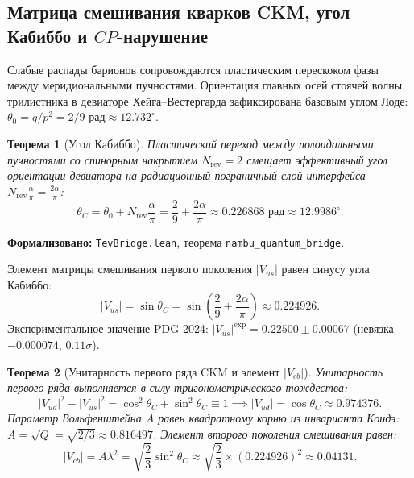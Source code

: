 \documentclass[11pt,a4paper]{article}
\newtheorem{theorem}{Теорема}
\theoremstyle{definition}
\theoremstyle{remark}
\begin{document}
\subsection{Матрица смешивания кварков CKM, угол Кабиббо и $CP$-нарушение}
	
Слабые распады барионов сопровождаются пластическим перескоком фазы между меридиональными пучностями. Ориентация главных осей стоячей волны трилистника в девиаторе Хейга--Вестергарда зафиксирована базовым углом Лоде: $\theta_0 = q / p^2 = 2/9\text{ рад} \approx 12.732^\circ$.
	
\begin{theorem}[Угол Кабиббо]
\label{thm:cabibbo_angle_exact}
Пластический переход между полоидальными пучностями со спинорным накрытием $N_{\mathrm{rev}} = 2$ смещает эффективный угол ориентации девиатора на радиационный пограничный слой интерфейса $N_{\mathrm{rev}}\frac{\alpha}{\pi} = \frac{2\alpha}{\pi}$:
\begin{equation}
	\theta_C = \theta_0 + N_{\mathrm{rev}}\frac{\alpha}{\pi} = \frac{2}{9} + \frac{2\alpha}{\pi} \approx 0.226868\text{ рад} \approx 12.9986^\circ.
	\label{eq:cabibbo_angle_exact}
\end{equation}
\end{theorem}

\noindent\small\textbf{Формализовано:} \texttt{TevBridge.lean}, теорема \texttt{nambu_quantum_bridge}.
	
Элемент матрицы смешивания первого поколения $|V_{us}|$ равен синусу угла Кабиббо:
\begin{equation}
	|V_{us}| = \sin\theta_C = \sin\left(\frac{2}{9} + \frac{2\alpha}{\pi}\right) \approx 0.224926.
	\label{eq:V_us_exact}
\end{equation}
Экспериментальное значение PDG 2024: $|V_{us}|^{\mathrm{exp}} = 0.22500 \pm 0.00067$ (невязка $-0.000074$, $0.11\sigma$).
	
\begin{theorem}[Унитарность первого ряда CKM и элемент $|V_{cb}|$]
\label{thm:wolfenstein_cb}
Унитарность первого ряда выполняется в силу тригонометрического тождества:
\begin{equation}
	|V_{ud}|^2 + |V_{us}|^2 = \cos^2\theta_C + \sin^2\theta_C \equiv 1 \implies |V_{ud}| = \cos\theta_C \approx 0.974376.
	\label{eq:V_ud_exact}
\end{equation}
	Параметр Вольфенштейна $A$ равен квадратному корню из инварианта Коидэ: $A = \sqrt{Q} = \sqrt{2/3} \approx 0.816497$. Элемент второго поколения смешивания равен:
\begin{equation}
	|V_{cb}| = A \lambda^2 = \sqrt{\frac{2}{3}} \sin^2\theta_C \approx \sqrt{\frac{2}{3}} \times (0.224926)^2 \approx 0.04131.
	\label{eq:V_cb_exact}
\end{equation}
\end{theorem}
\end{document}
